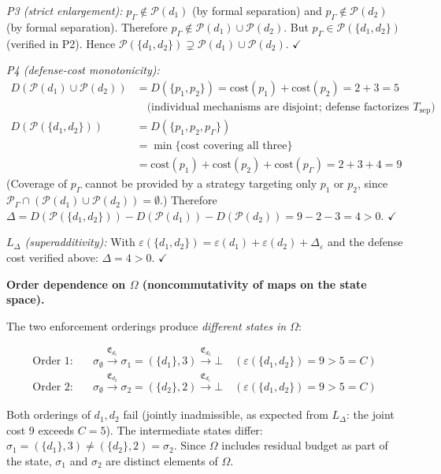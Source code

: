 \documentclass[11pt]{article}
\theoremstyle{remark}
\begin{document}
\textit{P3 (strict enlargement):}  $p_\Gamma \notin \mathcal{P}(d_1)$ (by
formal separation) and $p_\Gamma \notin \mathcal{P}(d_2)$ (by formal
separation).  Therefore $p_\Gamma \notin \mathcal{P}(d_1) \cup \mathcal{P}(d_2)$.
But $p_\Gamma \in \mathcal{P}(\{d_1,d_2\})$ (verified in P2).  Hence
$\mathcal{P}(\{d_1,d_2\}) \supsetneq \mathcal{P}(d_1) \cup \mathcal{P}(d_2)$.
$\checkmark$

\textit{P4 (defense-cost monotonicity):}
\begin{align*}
D(\mathcal{P}(d_1) \cup \mathcal{P}(d_2)) &= D(\{p_1, p_2\})
  = \mathrm{cost}(p_1) + \mathrm{cost}(p_2) = 2 + 3 = 5 \\
  &\quad\text{(individual mechanisms are disjoint; defense factorizes by $T_{\mathrm{sep}}$)}\\
D(\mathcal{P}(\{d_1,d_2\})) &= D(\{p_1, p_2, p_\Gamma\})\\
  &= \min\{\text{cost covering all three}\}\\
  &= \mathrm{cost}(p_1) + \mathrm{cost}(p_2) + \mathrm{cost}(p_\Gamma)
  = 2 + 3 + 4 = 9
\end{align*}
(Coverage of $p_\Gamma$ cannot be provided by a strategy targeting only
$p_1$ or $p_2$, since $\mathcal{P}_\Gamma \cap (\mathcal{P}(d_1) \cup
\mathcal{P}(d_2)) = \emptyset$.)
Therefore $\Delta = D(\mathcal{P}(\{d_1,d_2\})) - D(\mathcal{P}(d_1))
- D(\mathcal{P}(d_2)) = 9 - 2 - 3 = 4 > 0$.  $\checkmark$

\textit{$L_\Delta$ (superadditivity):}  With $\varepsilon(\{d_1,d_2\}) =
\varepsilon(d_1) + \varepsilon(d_2) + \Delta_\varepsilon$ and the defense
cost verified above: $\Delta = 4 > 0$.  $\checkmark$

\textbf{Order dependence on $\Omega$ (noncommutativity of maps on the state space).}

The two enforcement orderings produce \emph{different states in $\Omega$}:

\begin{align*}
\text{Order 1:}\quad &
  \sigma_\emptyset \xrightarrow{\mathfrak{E}_{d_1}} \sigma_1 = (\{d_1\}, 3)
  \xrightarrow{\mathfrak{E}_{d_2}} \bot \quad(\varepsilon(\{d_1,d_2\}) = 9 > 5 = C)\\
\text{Order 2:}\quad &
  \sigma_\emptyset \xrightarrow{\mathfrak{E}_{d_2}} \sigma_2 = (\{d_2\}, 2)
  \xrightarrow{\mathfrak{E}_{d_1}} \bot \quad(\varepsilon(\{d_1,d_2\}) = 9 > 5 = C)
\end{align*}

Both orderings of $d_1,d_2$ fail (jointly inadmissible, as expected from $L_\Delta$: the joint cost 9 exceeds $C = 5$).  The intermediate states differ: $\sigma_1 = (\{d_1\}, 3) \ne (\{d_2\}, 2) = \sigma_2$.
Since $\Omega$ includes residual budget as part of the state, $\sigma_1$ and
$\sigma_2$ are distinct elements of $\Omega$.
\end{document}
